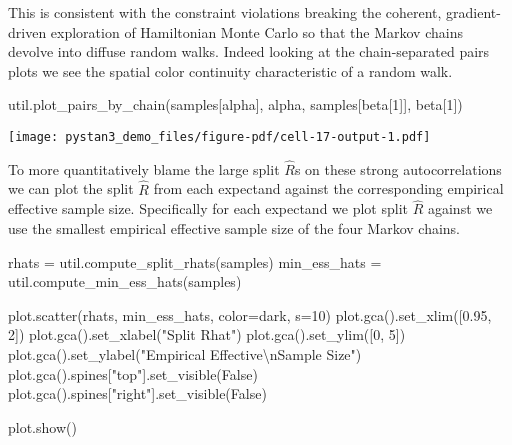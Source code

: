 \documentclass[
  letterpaper,
  DIV=11,
  numbers=noendperiod]{scrartcl}
\newenvironment{Shaded}{\begin{snugshade}}{\end{snugshade}}
\newcommand{\CharTok}[1]{\textcolor[rgb]{0.13,0.47,0.30}{#1}}
\newcommand{\DecValTok}[1]{\textcolor[rgb]{0.68,0.00,0.00}{#1}}
\newcommand{\FloatTok}[1]{\textcolor[rgb]{0.68,0.00,0.00}{#1}}
\newcommand{\NormalTok}[1]{\textcolor[rgb]{0.00,0.23,0.31}{#1}}
\newcommand{\OperatorTok}[1]{\textcolor[rgb]{0.37,0.37,0.37}{#1}}
\newcommand{\StringTok}[1]{\textcolor[rgb]{0.13,0.47,0.30}{#1}}
\newcommand{\VariableTok}[1]{\textcolor[rgb]{0.07,0.07,0.07}{#1}}
\begin{document}
This is consistent with the constraint violations breaking the coherent,
gradient-driven exploration of Hamiltonian Monte Carlo so that the
Markov chains devolve into diffuse random walks. Indeed looking at the
chain-separated pairs plots we see the spatial color continuity
characteristic of a random walk.

\begin{Shaded}
\begin{Highlighting}[]
\NormalTok{util.plot\_pairs\_by\_chain(samples[}\StringTok{\textquotesingle{}alpha\textquotesingle{}}\NormalTok{], }\StringTok{\textquotesingle{}alpha\textquotesingle{}}\NormalTok{, }
\NormalTok{                         samples[}\StringTok{\textquotesingle{}beta[1]\textquotesingle{}}\NormalTok{], }\StringTok{\textquotesingle{}beta[1]\textquotesingle{}}\NormalTok{)}
\end{Highlighting}
\end{Shaded}

\texttt{[image: pystan3\_demo\_files/figure-pdf/cell-17-output-1.pdf]}

To more quantitatively blame the large split \(\hat{R}\)s on these
strong autocorrelations we can plot the split \(\hat{R}\) from each
expectand against the corresponding empirical effective sample size.
Specifically for each expectand we plot split \(\hat{R}\) against we use
the smallest empirical effective sample size of the four Markov chains.

\begin{Shaded}
\begin{Highlighting}[]
\NormalTok{rhats }\OperatorTok{=}\NormalTok{ util.compute\_split\_rhats(samples)}
\NormalTok{min\_ess\_hats }\OperatorTok{=}\NormalTok{ util.compute\_min\_ess\_hats(samples)}

\NormalTok{plot.scatter(rhats, min\_ess\_hats, color}\OperatorTok{=}\NormalTok{dark, s}\OperatorTok{=}\DecValTok{10}\NormalTok{)}
\NormalTok{plot.gca().set\_xlim([}\FloatTok{0.95}\NormalTok{, }\DecValTok{2}\NormalTok{])}
\NormalTok{plot.gca().set\_xlabel(}\StringTok{"Split Rhat"}\NormalTok{)}
\NormalTok{plot.gca().set\_ylim([}\DecValTok{0}\NormalTok{, }\DecValTok{5}\NormalTok{])}
\NormalTok{plot.gca().set\_ylabel(}\StringTok{"Empirical Effective}\CharTok{\textbackslash{}n}\StringTok{Sample Size"}\NormalTok{)}
\NormalTok{plot.gca().spines[}\StringTok{"top"}\NormalTok{].set\_visible(}\VariableTok{False}\NormalTok{)}
\NormalTok{plot.gca().spines[}\StringTok{"right"}\NormalTok{].set\_visible(}\VariableTok{False}\NormalTok{)}

\NormalTok{plot.show()}
\end{Highlighting}
\end{Shaded}
\end{document}
